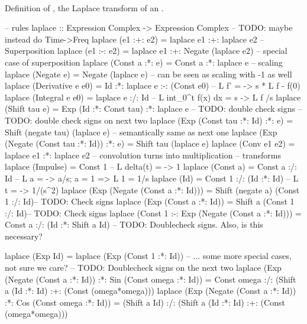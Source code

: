 \begin{codefig}
 ~\\
\caption{Definition of , the Laplace transform of an .}\label{code:laplace-def}
\begin{code}
-- rules
laplace :: Expression Complex -> Expression Complex -- TODO: maybe instead do Time->Freq
laplace (e1 :+: e2) = laplace e1 :+: laplace e2 -- Superposition
laplace (e1 :-: e2) = laplace e1 :+: Negate (laplace e2) -- special case of superposition
laplace (Const a :*: e) = Const a :*: laplace e -- scaling
laplace (Negate e) = Negate (laplace e) -- can be seen as scaling with -1 as well
laplace (Derivative e e0) = Id :*: laplace e :-: (Const e0) -- L {f'} = \s -> s * L {f} - f(0)
laplace (Integral e e0) = laplace e :/: Id -- L {int_0^t f(x) dx} = s -> L {f} /s 
laplace (Shift tau e) = Exp (Id :*: Const tau) :*: laplace e -- TODO: double check signs
  -- TODO: double check signs on next two
laplace (Exp (Const tau :*: Id) :*: e) = Shift (negate tau) (laplace e) -- semantically same as next one
laplace (Exp (Negate (Const tau :*: Id)) :*: e) = Shift tau (laplace e)
laplace (Conv e1 e2) = laplace e1 :*: laplace e2 -- convolution turns into multiplication
-- transforms
laplace (Impulse) = Const 1 -- L {delta(t)} = \s -> 1
laplace (Const a) = Const a :/: Id -- L {a} = \s -> a/s; a = 1 => L {1} = 1/s
laplace (Id)      = Const 1 :/: (Id :*: Id) -- L {t} = \s -> 1/(s^2)
laplace (Exp (Negate (Const a :*: Id))) = Shift (negate a) (Const 1 :/: Id)-- TODO: Check signs
laplace (Exp (Const a :*: Id)) = Shift a (Const 1 :/: Id)-- TODO: Check signs
laplace (Const 1 :-: Exp (Negate (Const a :*: Id))) = Const a :/: (Id :*: Shift a Id) -- TODO: Doublecheck signs. Also, is this necessary?

laplace (Exp Id) = laplace (Exp (Const 1 :*: Id))
-- ... some more special cases, not sure we care?
-- TODO: Doublecheck signs on the next two
laplace (Exp (Negate (Const a :*: Id)) :*: Sin (Const omega :*: Id)) = Const omega :/: (Shift a (Id :*: Id) :+: (Const (omega*omega)))
laplace (Exp (Negate (Const a :*: Id)) :*: Cos (Const omega :*: Id)) = (Shift a Id) :/: (Shift a (Id :*: Id) :+: (Const (omega*omega)))
\end{code}
\end{codefig}

